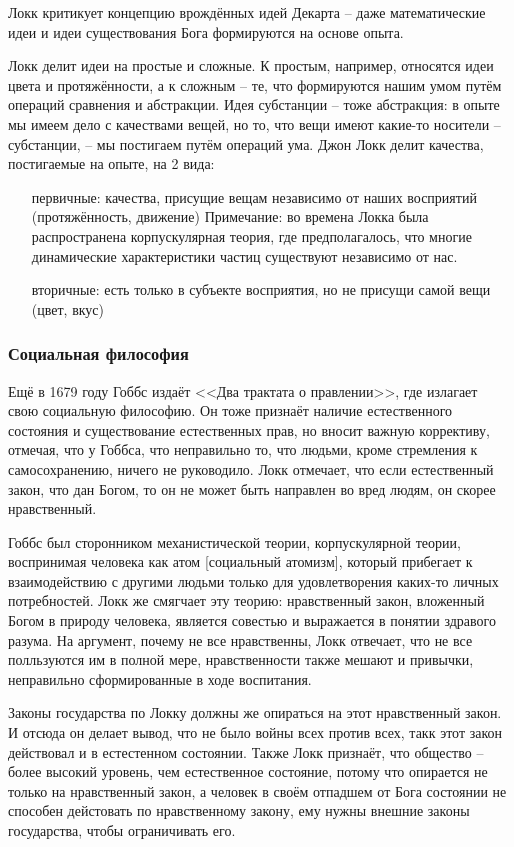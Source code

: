 \documentclass[a4paper, 12pt]{book} %
\begin{document}
Локк критикует концепцию врождённых идей Декарта -- даже математические идеи и идеи существования Бога формируются на основе опыта.

Локк делит идеи на простые и сложные. К простым, например, относятся идеи цвета и протяжённости, а к сложным -- те, что формируются нашим умом путём операций сравнения и абстракции. Идея субстанции -- тоже абстракция: в опыте мы имеем дело с качествами вещей, но то, что вещи имеют какие-то носители -- субстанции, -- мы постигаем путём операций ума.
\newpage
Джон Локк делит качества, постигаемые на опыте, на 2 вида:
\begin{itemize}
\item[первичные:] качества, присущие вещам независимо от наших восприятий (протяжённость, движение)
Примечание: во времена Локка была распространена корпускулярная теория, где предполагалось, что многие динамические характеристики частиц существуют независимо от нас.
\item[вторичные:] есть только в субъекте восприятия, но не присущи самой вещи (цвет, вкус) 
\end{itemize}

\subsubsection{Социальная философия}
Ещё в 1679 году Гоббс издаёт <<Два трактата о правлении>>, где излагает свою социальную философию. Он тоже признаёт наличие естественного состояния и существование естественных прав, но вносит важную коррективу, отмечая, что у Гоббса, что неправильно то, что людьми, кроме стремления к самосохранению, ничего не руководило. Локк отмечает, что если естественный закон, что дан Богом, то он не может быть направлен во вред людям, он скорее нравственный. 

Гоббс был сторонником механистической теории, корпускулярной теории, воспринимая человека как атом [социальный атомизм], который прибегает к взаимодействию с другими людьми только для удовлетворения каких-то личных потребностей. Локк же смягчает эту теорию: нравственный закон, вложенный Богом в природу человека, является совестью и выражается в понятии здравого разума. На аргумент, почему не все нравственны, Локк отвечает, что не все полльзуются им в полной мере, нравственности также мешают и привычки, неправильно сформированные в ходе воспитания.

Законы государства по Локку должны же опираться на этот нравственный закон. И отсюда он делает вывод, что не было войны всех против всех, такк этот закон действовал и в естестенном состоянии. Также Локк признаёт, что общество -- более высокий уровень, чем естественное состояние, потому что опирается не только на нравственный закон, а человек в своём отпадшем от Бога состоянии не способен дейстовать по нравственному закону, ему нужны внешние законы государства, чтобы ограничивать его.
\end{document}
